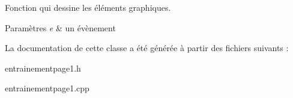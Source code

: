 Fonction qui dessine les éléments graphiques. 


\begin{DoxyParams}{Paramètres}
{\em e} & un évènement \\
\hline
\end{DoxyParams}


La documentation de cette classe a été générée à partir des fichiers suivants \-:\begin{DoxyCompactItemize}
\item 
entrainementpage1.\-h\item 
entrainementpage1.\-cpp\end{DoxyCompactItemize}
